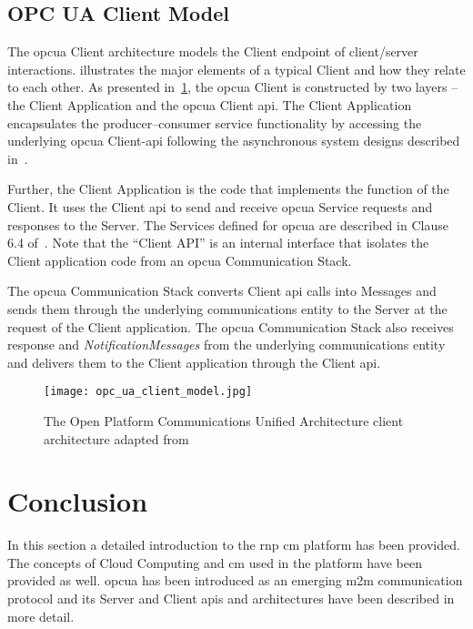 \documentclass[
a4paper,
twoside,
headsepline,
cleardoublepage=empty,
parskip=half,
draft=false
]{scrbook}
\begin{document}
			\subsection{OPC UA Client Model}\label{subsec:opc_ua_client_model}

				The \gls{opcua} Client architecture models the Client endpoint of client/server interactions.
				 illustrates the major elements of a typical Client and how they relate to each other.
				As presented in~\cref{fig:opc_ua_client_model}, the \gls{opcua} Client is constructed by two layers -- the Client Application and the \gls{opcua} Client \gls{api}. The Client Application encapsulates the producer–consumer service functionality by accessing the underlying \gls{opcua} Client-\gls{api} following the asynchronous system designs described in~\cite{tanenbaum2007distributed}.
				
				Further, the Client Application is the code that implements the function of the Client.
				It uses the Client \gls{api} to send and receive \gls{opcua} Service requests and responses to the Server.
				The Services defined for \gls{opcua} are described in Clause 6.4 of~\cite{opcfoundation2017part4}.
				Note that the ``Client API'' is an internal interface that isolates the Client application code from an \gls{opcua} Communication Stack.
				
				The \gls{opcua} Communication Stack converts Client \gls{api} calls into Messages and sends them through the underlying communications entity to the Server at the request of the Client application.
				The \gls{opcua} Communication Stack also receives response and \textit{NotificationMessages} from the underlying communications entity and delivers them to the Client application through the Client \gls{api}.

				\begin{figure}[H]
					\centering
					\texttt{[image: opc\_ua\_client\_model.jpg]}
					\caption{The Open Platform Communications Unified Architecture client architecture adapted from~\cite{opcfoundation2017part1}}
					\label{fig:opc_ua_client_model}
				\end{figure}
			
		\section{Conclusion}\label{sec:foundations_conclusion}
		
			In this section a detailed introduction to the \gls{rnp} \gls{cm} platform has been provided. 
			The concepts of Cloud Computing and \gls{cm} used in the platform have been provided as well. 
			\gls{opcua} has been introduced as an emerging \gls{m2m} communication protocol and its Server and Client \gls{api}s and architectures have been described in more detail. 		
\end{document}
